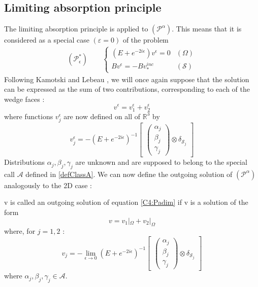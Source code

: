 \subsection{Limiting absorption principle}
The limiting absorption principle is applied to $(\mathcal{P}^{\alpha})$. This means that it is considered as a special case $(\varepsilon=0)$ of the problem
\begin{eqnarray}
(\mathcal{P}^*_{\epsilon}) \hspace{2em} \left\{
\begin{array}{lr}
(E+e^{-2i\epsilon})v^{\epsilon}=0 & (\Omega) \\
Bv^{\epsilon}=-Bv_*^{inc} & (\mathcal{S})
\end{array}
\right.
\label{C4:Pabs}
\end{eqnarray}
Following Kamotski and Lebeau \cite{KamotskiLebeau}, we will once again suppose that the solution can be expressed as the sum of two contributions, corresponding to each of the wedge faces :
\begin{equation}
v^{\epsilon}=v_1^{\epsilon}+v_2^{\epsilon}
\label{C4:v1+v2}
\end{equation}
where functions $v_j^{\epsilon}$ are now defined on all of  $\mathbb{R}^3$ by
\begin{equation}
v_j^{\epsilon}=-(E+e^{-2i\epsilon})^{-1} \begin{bmatrix}
\begin{pmatrix}
\alpha_j \\
\beta_j \\
\gamma_j
\end{pmatrix}
\otimes \delta_{\mathcal{S}_j}
\end{bmatrix}
\label{C4:vjdef}
\end{equation}
Distributions $\alpha_j,\beta_j, \gamma_j $ are unknown and are supposed to belong to the special call $\mathcal{A}$ defined in \ref{defClassA}. We can now define the outgoing solution of $(\mathcal{P}^{\alpha})$ analogously to the 2D case :
\begin{definition}
	 v is called an outgoing solution of equation \eqref{C4:Padim} if v is a solution of the form
	\begin{equation}
	\label{C4:decomposition}
	v=v_1|_{\Omega}+v_2|_{\Omega}
	\end{equation}
	where, for $j=1,2$ :
	\begin{equation}
	\label{C4:inv_potentiels}
	v_j=-\lim_{\epsilon \to 0} (E+e^{-2i\epsilon})^{-1} \begin{bmatrix}
\begin{pmatrix}
\alpha_j \\
\beta_j \\
\gamma_j
\end{pmatrix}
\otimes \delta_{\mathcal{S}_j}
\end{bmatrix}
	\end{equation}
	where $\alpha_j,\beta_j,\gamma_j \in \mathcal{A}$. %
\end{definition}
